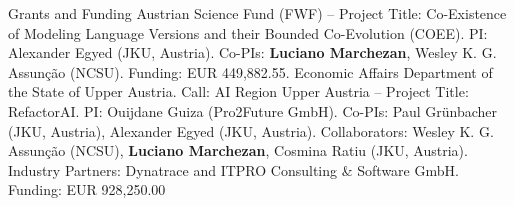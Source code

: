 \begin{rubric}{Grants and Funding}
\entry*[2025 -- 2029] Austrian Science Fund (FWF) -- Project Title: Co-Existence of Modeling Language Versions and their Bounded Co-Evolution (COEE). PI: Alexander Egyed (JKU, Austria). Co-PIs: \textbf{Luciano Marchezan}, Wesley K. G. Assunção (NCSU). Funding: EUR 449,882.55.
\entry*[2025 -- 2028] Economic Affairs Department of the State of Upper Austria. Call: AI Region Upper Austria -- Project Title: RefactorAI.
PI: Ouijdane Guiza (Pro2Future GmbH).
Co-PIs: Paul Grünbacher (JKU, Austria), Alexander Egyed (JKU, Austria). Collaborators: Wesley K. G. Assunção (NCSU), \textbf{Luciano Marchezan}, Cosmina Ratiu (JKU, Austria). Industry Partners: Dynatrace and ITPRO Consulting \& Software GmbH. 
Funding: EUR 928,250.00
 

\end{rubric}
